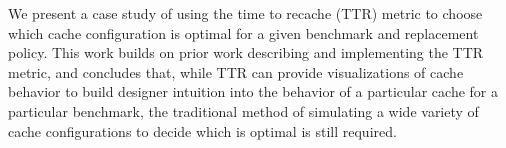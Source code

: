 We present a case study of using the time to recache (TTR) metric to choose which cache configuration is optimal for a given benchmark and replacement policy.
This work builds on prior work describing and implementing the TTR metric, and concludes that, while TTR can provide visualizations of cache behavior to build designer intuition into the behavior of a particular cache for a particular benchmark, the traditional method of simulating a wide variety of cache configurations to decide which is optimal is still required.